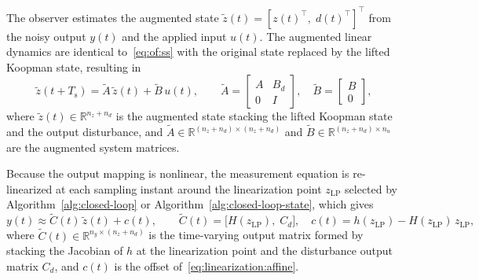 \documentclass[preprint,12pt,authoryear]{elsarticle}
\theoremstyle{remark}
\newcommand{\ui}[2]{#1_{\text{#2}}}
\begin{document}
The observer estimates the augmented state $\tilde{z}(t) = [z(t)^\intercal,\; d(t)^\intercal]^\intercal$ from the
noisy output $y(t)$ and the applied input $u(t)$.
The augmented linear dynamics are identical to~\eqref{eq:of:ss} with the original state replaced by the
lifted Koopman state, resulting in
\begin{equation}
  \label{eq:tvkf:aug}
  \tilde{z}(t+T_\text{s}) = \tilde{A}\,\tilde{z}(t) + \tilde{B}\,u(t),
  \qquad
  \tilde{A} =
  \begin{bmatrix} A & B_d \\ 0 & I \end{bmatrix},
  \quad
  \tilde{B} =
  \begin{bmatrix} B \\ 0 \end{bmatrix},
\end{equation}
where $\tilde{z}(t) \in \mathbb{R}^{n_z + n_d}$ is the augmented state stacking the lifted Koopman state
and the output disturbance, and $\tilde{A} \in \mathbb{R}^{(n_z+n_d)\times(n_z+n_d)}$ and $\tilde{B} \in \mathbb{R}^{(n_z+n_d)\times n_u}$ are the augmented system matrices.

Because the output mapping is nonlinear, the measurement equation is re-linearized at each
sampling instant around the linearization point $\ui{z}{LP}$ selected by Algorithm~\ref{alg:closed-loop} or Algorithm~\ref{alg:closed-loop-state}, which gives
\begin{equation}
  \label{eq:tvkf:meas}
  y(t) \approx \tilde{C}(t)\,\tilde{z}(t) + c(t),
  \qquad
  \tilde{C}(t) = \bigl[H(\ui{z}{LP}),\; C_d\bigr],
  \quad
  c(t) = h(\ui{z}{LP}) - H(\ui{z}{LP})\,\ui{z}{LP},
\end{equation}
where $\tilde{C}(t) \in \mathbb{R}^{n_y \times (n_z + n_d)}$ is the time-varying output matrix formed by
stacking the Jacobian of $h$ at the linearization point
and the disturbance output matrix $C_d$, and $c(t)$ is the offset of~\eqref{eq:linearization:affine}.
\end{document}
